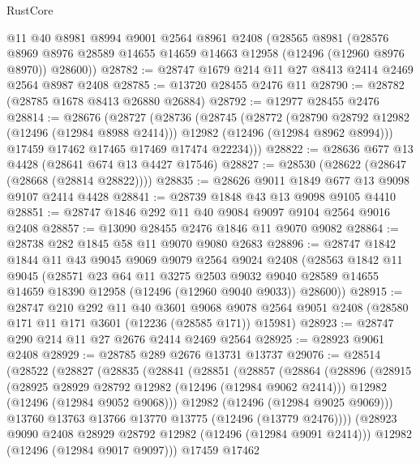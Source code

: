 \begin{lexlean}{RustCore}
\begin{coremodule}
    @11
    @40
    @8981
    @8994
    @9001
    @2564
    @8961
    @2408
    (@28565
      @8981
      (@28576 @8969 @8976 @28589 @14655 @14659 @14663 @12958 (@12496 (@12960 @8976 @8970)) @28600))
@28782 := @28747 @1679 @214 @11 @27 @8413 @2414 @2469 @2564 @8987 @2408
@28785 := @13720 @28455 @2476 @11
@28790 := @28782 (@28785 @1678 @8413 @26880 @26884)
@28792 := @12977 @28455 @2476
@28814 := @28676
    (@28727
      (@28736
        (@28745
          (@28772
            (@28790 @28792 @12982 (@12496 (@12984 @8988 @2414)))
            @12982
            (@12496 (@12984 @8962 @8994)))
          @17459
          @17462
          @17465
          @17469
          @17474
          @22234)))
@28822 := @28636 @677 @13 @4428 (@28641 @674 @13 @4427 @17546)
@28827 := @28530 (@28622 (@28647 (@28668 (@28814 @28822))))
@28835 := @28626 @9011 @1849 @677 @13 @9098 @9107 @2414 @4428
@28841 := @28739 @1848 @43 @13 @9098 @9105 @4410
@28851 := @28747 @1846 @292 @11 @40 @9084 @9097 @9104 @2564 @9016 @2408
@28857 := @13090 @28455 @2476 @1846 @11 @9070 @9082
@28864 := @28738 @282 @1845 @58 @11 @9070 @9080 @2683
@28896 := @28747
    @1842
    @1844
    @11
    @43
    @9045
    @9069
    @9079
    @2564
    @9024
    @2408
    (@28563
      @1842
      @11
      @9045
      (@28571
        @23
        @64
        @11
        @3275
        @2503
        @9032
        @9040
        @28589
        @14655
        @14659
        @18390
        @12958
        (@12496 (@12960 @9040 @9033))
        @28600))
@28915 := @28747
    @210
    @292
    @11
    @40
    @3601
    @9068
    @9078
    @2564
    @9051
    @2408
    (@28580 @171 @11 @171 @3601 (@12236 (@28585 @171)) @15981)
@28923 := @28747 @290 @214 @11 @27 @2676 @2414 @2469 @2564
@28925 := @28923 @9061 @2408
@28929 := @28785 @289 @2676 @13731 @13737
@29076 := @28514
    (@28522
      (@28827
        (@28835
          (@28841
            (@28851
              (@28857
                (@28864
                  (@28896
                    (@28915
                      (@28925 @28929 @28792 @12982 (@12496 (@12984 @9062 @2414)))
                      @12982
                      (@12496 (@12984 @9052 @9068)))
                    @12982
                    (@12496 (@12984 @9025 @9069)))
                  @13760
                  @13763
                  @13766
                  @13770
                  @13775
                  (@12496 (@13779 @2476))))
              (@28923 @9090 @2408 @28929 @28792 @12982 (@12496 (@12984 @9091 @2414)))
              @12982
              (@12496 (@12984 @9017 @9097)))
            @17459
            @17462

\end{coremodule}
\end{lexlean}
